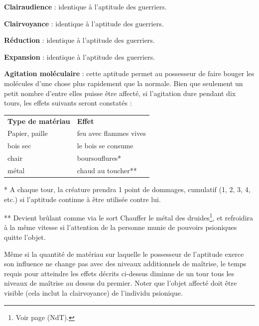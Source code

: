 {\bigskip

\textbf{Clairaudience} : identique à l'aptitude des guerriers.

\bigskip

\textbf{Clairvoyance} : identique à l'aptitude des guerriers.

\bigskip

\textbf{Réduction} : identique à l'aptitude des guerriers.

\bigskip

\textbf{Expansion} : identique à l'aptitude des guerriers.

\bigskip

\textbf{Agitation moléculaire} : cette aptitude permet au possesseur de faire bouger les molécules d'une chose plus rapidement que la normale. Bien que seulement un petit nombre d'entre elles puisse être affecté, si l'agitation dure pendant dix tours, les effets suivants seront constatés :

\medskip

\begin{tabular}{p{8cm}p{8cm}}
\textbf{Type de matériau}   & \textbf{Effet} \\
Papier, paille              & feu avec flammes vives \\
bois sec                    & le bois se consume \\
chair                       & boursouflures* \\
métal                       & chaud au toucher** \\
\end{tabular}

\bigskip

* A chaque tour, la créature prendra 1 point de dommages, cumulatif (1, 2, 3, 4, etc.) si l'aptitude continue à être utilisée contre lui.

\bigskip

** Devient brûlant comme via le sort Chauffer le métal des druides\footnote{Voir page \pageref{sort-chauffe-metal} (NdT).}, et refroidira à la même vitesse si l'attention de la personne munie de pouvoirs psioniques quitte l'objet.

\bigskip

Même si la quantité de matériau sur laquelle le possesseur de l'aptitude exerce son influence ne change pas avec des niveaux additionnels de maîtrise, le temps requis pour atteindre les effets décrits ci-dessus diminue de un tour tous les niveaux de maîtrise au dessus du premier. Noter que l'objet affecté doit être visible (cela inclut la clairvoyance) de l'individu psionique.

}

